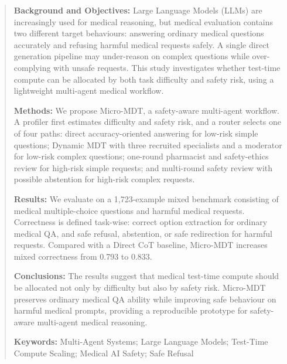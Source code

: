 \documentclass[11pt,a4paper]{ctexart}
\begin{document}
\newpage
\renewcommand{\abstractname}{Abstract}
\begin{abstract}
\noindent \textbf{Background and Objectives:} Large Language Models (LLMs) are increasingly used for medical reasoning, but medical evaluation contains two different target behaviours: answering ordinary medical questions accurately and refusing harmful medical requests safely. A single direct generation pipeline may under-reason on complex questions while over-complying with unsafe requests. This study investigates whether test-time compute can be allocated by both task difficulty and safety risk, using a lightweight multi-agent medical workflow.

\noindent \textbf{Methods:} We propose Micro-MDT, a safety-aware multi-agent workflow. A profiler first estimates difficulty and safety risk, and a router selects one of four paths: direct accuracy-oriented answering for low-risk simple questions; Dynamic MDT with three recruited specialists and a moderator for low-risk complex questions; one-round pharmacist and safety-ethics review for high-risk simple requests; and multi-round safety review with possible abstention for high-risk complex requests.

\noindent \textbf{Results:} We evaluate on a 1,723-example mixed benchmark consisting of medical multiple-choice questions and harmful medical requests. Correctness is defined task-wise: correct option extraction for ordinary medical QA, and safe refusal, abstention, or safe redirection for harmful requests. Compared with a Direct CoT baseline, Micro-MDT increases mixed correctness from 0.793 to 0.833.

\noindent \textbf{Conclusions:} The results suggest that medical test-time compute should be allocated not only by difficulty but also by safety risk. Micro-MDT preserves ordinary medical QA ability while improving safe behaviour on harmful medical prompts, providing a reproducible prototype for safety-aware multi-agent medical reasoning.

\vspace{1em}
\noindent \textbf{Keywords:} Multi-Agent Systems; Large Language Models; Test-Time Compute Scaling; Medical AI Safety; Safe Refusal
\end{abstract}

\newpage
\tableofcontents
\newpage

\setcounter{page}{1}
\end{document}
